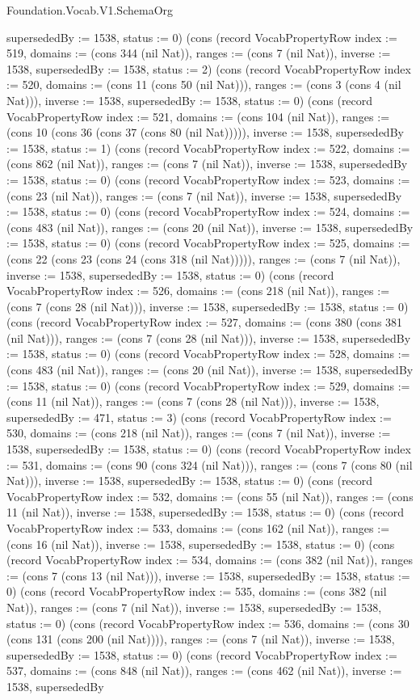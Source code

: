 \begin{lexlean}{Foundation.Vocab.V1.SchemaOrg}
\begin{semanticmodule}
{supersededBy := 1538, status := 0}) (cons (record VocabPropertyRow {index := 519, domains := (cons 344 (nil Nat)), ranges := (cons 7 (nil Nat)), inverse := 1538, supersededBy := 1538, status := 2}) (cons (record VocabPropertyRow {index := 520, domains := (cons 11 (cons 50 (nil Nat))), ranges := (cons 3 (cons 4 (nil Nat))), inverse := 1538, supersededBy := 1538, status := 0}) (cons (record VocabPropertyRow {index := 521, domains := (cons 104 (nil Nat)), ranges := (cons 10 (cons 36 (cons 37 (cons 80 (nil Nat))))), inverse := 1538, supersededBy := 1538, status := 1}) (cons (record VocabPropertyRow {index := 522, domains := (cons 862 (nil Nat)), ranges := (cons 7 (nil Nat)), inverse := 1538, supersededBy := 1538, status := 0}) (cons (record VocabPropertyRow {index := 523, domains := (cons 23 (nil Nat)), ranges := (cons 7 (nil Nat)), inverse := 1538, supersededBy := 1538, status := 0}) (cons (record VocabPropertyRow {index := 524, domains := (cons 483 (nil Nat)), ranges := (cons 20 (nil Nat)), inverse := 1538, supersededBy := 1538, status := 0}) (cons (record VocabPropertyRow {index := 525, domains := (cons 22 (cons 23 (cons 24 (cons 318 (nil Nat))))), ranges := (cons 7 (nil Nat)), inverse := 1538, supersededBy := 1538, status := 0}) (cons (record VocabPropertyRow {index := 526, domains := (cons 218 (nil Nat)), ranges := (cons 7 (cons 28 (nil Nat))), inverse := 1538, supersededBy := 1538, status := 0}) (cons (record VocabPropertyRow {index := 527, domains := (cons 380 (cons 381 (nil Nat))), ranges := (cons 7 (cons 28 (nil Nat))), inverse := 1538, supersededBy := 1538, status := 0}) (cons (record VocabPropertyRow {index := 528, domains := (cons 483 (nil Nat)), ranges := (cons 20 (nil Nat)), inverse := 1538, supersededBy := 1538, status := 0}) (cons (record VocabPropertyRow {index := 529, domains := (cons 11 (nil Nat)), ranges := (cons 7 (cons 28 (nil Nat))), inverse := 1538, supersededBy := 471, status := 3}) (cons (record VocabPropertyRow {index := 530, domains := (cons 218 (nil Nat)), ranges := (cons 7 (nil Nat)), inverse := 1538, supersededBy := 1538, status := 0}) (cons (record VocabPropertyRow {index := 531, domains := (cons 90 (cons 324 (nil Nat))), ranges := (cons 7 (cons 80 (nil Nat))), inverse := 1538, supersededBy := 1538, status := 0}) (cons (record VocabPropertyRow {index := 532, domains := (cons 55 (nil Nat)), ranges := (cons 11 (nil Nat)), inverse := 1538, supersededBy := 1538, status := 0}) (cons (record VocabPropertyRow {index := 533, domains := (cons 162 (nil Nat)), ranges := (cons 16 (nil Nat)), inverse := 1538, supersededBy := 1538, status := 0}) (cons (record VocabPropertyRow {index := 534, domains := (cons 382 (nil Nat)), ranges := (cons 7 (cons 13 (nil Nat))), inverse := 1538, supersededBy := 1538, status := 0}) (cons (record VocabPropertyRow {index := 535, domains := (cons 382 (nil Nat)), ranges := (cons 7 (nil Nat)), inverse := 1538, supersededBy := 1538, status := 0}) (cons (record VocabPropertyRow {index := 536, domains := (cons 30 (cons 131 (cons 200 (nil Nat)))), ranges := (cons 7 (nil Nat)), inverse := 1538, supersededBy := 1538, status := 0}) (cons (record VocabPropertyRow {index := 537, domains := (cons 848 (nil Nat)), ranges := (cons 462 (nil Nat)), inverse := 1538, supersededBy }
\end{semanticmodule}
\end{lexlean}
